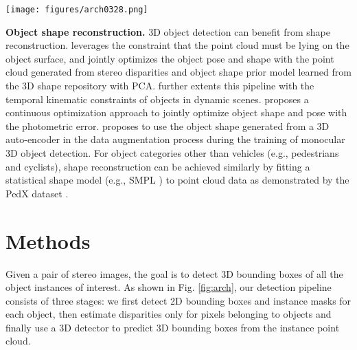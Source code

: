 \documentclass[10pt,twocolumn,letterpaper]{article}
\begin{document}
\begin{figure*}
    \centering
       \texttt{[image: figures/arch0328.png]}
       \caption{
           \textbf{Disp R-CNN Architecture.}
           Disp R-CNN has three stages. 
           First, the input images are passed through a stereo variant of Mask R-CNN to detect 2D bounding boxes and instance segmentation masks.
           Then, the instance disparity estimation network (iDispNet) takes the cropped RoI images as input and estimates an instance disparity map.
           Finally, the instance disparity map is converted to an instance point cloud and fed into the 3D detector for 3D bounding box regression.
           }
       \label{fig:arch}
   \end{figure*} 
\medskip
\noindent\textbf{Object shape reconstruction.}
3D object detection can benefit from shape reconstruction.
\cite{engelmann2016joint} leverages the constraint that the point cloud must be lying on the object surface, and jointly optimizes the object pose and shape with the point cloud generated from stereo disparities and object shape prior model learned from the 3D shape repository with PCA.
\cite{murthy2017shape} further extents this pipeline with the temporal kinematic constraints of objects in dynamic scenes.
\cite{wang2020directshape} proposes a continuous optimization approach to jointly optimize object shape and pose with the photometric error.
\cite{manhardt2019roi} proposes to use the object shape generated from a 3D auto-encoder in the data augmentation process during the training of monocular 3D object detection.
For object categories other than vehicles (e.g., pedestrians and cyclists), shape reconstruction can be achieved similarly by fitting a statistical shape model (e.g., SMPL \cite{loper2015smpl}) to point cloud data as demonstrated by the PedX dataset \cite{kimPedXBenchmarkDataset2018}. 
 
\section{Methods}
Given a pair of stereo images, the goal is to detect 3D bounding boxes of all the object instances of interest.
As shown in Fig. \ref{fig:arch}, our detection pipeline consists of three stages: we first detect 2D bounding boxes
and instance masks for each object, then estimate disparities only for pixels belonging to objects and finally use a 3D detector to predict 3D bounding boxes from the instance point cloud.
\end{document}
